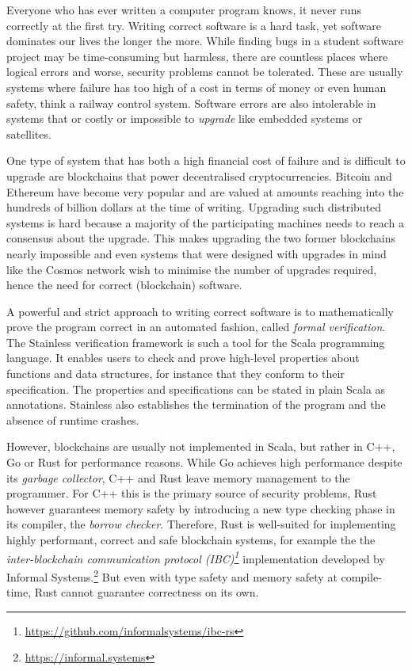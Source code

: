 Everyone who has ever written a computer program knows, it never runs correctly
at the first try. Writing correct software is a hard task, yet software
dominates our lives the longer the more. While finding bugs in a student
software project may be time-consuming but harmless, there are countless places
where logical errors and worse, security problems cannot be tolerated. These are
usually systems where failure has too high of a cost in terms of money or even
human safety, think a railway control system. Software errors are also
intolerable in systems that or costly or impossible to \emph{upgrade} like
embedded systems or satellites.

One type of system that has both a high financial cost of failure and is
difficult to upgrade are blockchains that power decentralised cryptocurrencies.
Bitcoin \cite{bitcoin} and Ethereum \cite{ethereum} have become very popular and
are valued at amounts reaching into the hundreds of billion dollars at the time
of writing. Upgrading such distributed systems is hard because a majority of the
participating machines needs to reach a consensus about the upgrade. This makes
upgrading the two former blockchains nearly impossible and even systems that
were designed with upgrades in mind like the Cosmos network \cite{cosmos} wish
to minimise the number of upgrades required, hence the need for correct
(blockchain) software.

A powerful and strict approach to writing correct software is to mathematically
prove the program correct in an automated fashion, called \emph{formal
verification}. The Stainless verification framework \cite{stainless} is such a
tool for the Scala programming language. It enables users to check and prove
high-level properties about functions and data structures, for instance that
they conform to their specification. The properties and specifications can be
stated in plain Scala as annotations. Stainless also establishes the termination
of the program and the absence of runtime crashes.

However, blockchains are usually not implemented in Scala, but rather in C++, Go
or Rust for performance reasons. While Go achieves high performance despite its
\emph{garbage collector}, C++ and Rust leave memory management to the
programmer. For C++ this is the primary source of security problems, Rust
however guarantees memory safety by introducing a new type checking phase in its
compiler, the \emph{borrow checker}. Therefore, Rust is well-suited for
implementing highly performant, correct and safe blockchain systems, for example
the  the \emph{inter-blockchain communication protocol
(IBC)\footnote{\url{https://github.com/informalsystems/ibc-rs}}} implementation
developed by Informal Systems.\footnote{\url{https://informal.systems}} But even
with type safety and memory safety at compile-time, Rust cannot guarantee
correctness on its own.

